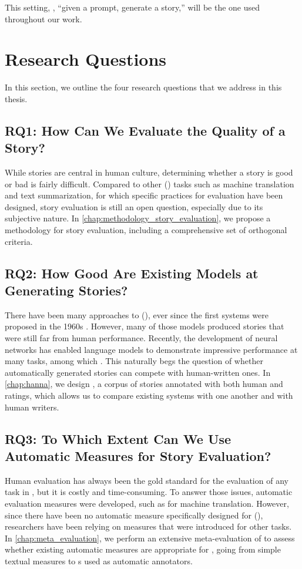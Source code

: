 This setting, {\ie}, ``given a prompt, generate a story,'' will be the one used throughout our work.

\section{Research Questions}

In this section, we outline the four research questions that we address in this thesis.

\subsection{RQ1: How Can We Evaluate the Quality of a Story?}
While stories are central in human culture, determining whether a story is good or bad is fairly difficult. Compared to other {\nlpfull} (\nlp) tasks such as machine translation and text summarization, for which specific practices for evaluation have been designed, story evaluation is still an open question, especially due to its subjective nature. In \autoref{chap:methodology_story_evaluation}, we propose a methodology for story evaluation, including a comprehensive set of orthogonal criteria.

\subsection{RQ2: How Good Are Existing Models at Generating Stories?}
There have been many approaches to {\asgfull} (\asg), ever since the first systems were proposed in the 1960s \citep{ryan2017grimes, propp1968morphology}. However, many of those models produced stories that were still far from human performance. Recently, the development of neural networks has enabled language models to demonstrate impressive performance at many {\nlp} tasks, among which \asg. This naturally begs the question of whether automatically generated stories can compete with human-written ones. In \autoref{chap:hanna}, we design {\hanna}, a corpus of stories annotated with both human and {\llm} ratings, which allows us to compare existing systems with one another and with human writers.

\subsection{RQ3: To Which Extent Can We Use Automatic Measures for Story Evaluation?}
Human evaluation has always been the gold standard for the evaluation of any task in {\nlp}, but it is costly and time-consuming. To answer those issues, automatic evaluation measures were developed, such as {\bleu} \citep{papineni2002bleu} for machine translation. However, since there have been no automatic measure specifically designed for {\asefull} (\ase), researchers have been relying on measures that were introduced for other tasks. In \autoref{chap:meta_evaluation}, we perform an extensive meta-evaluation of {\asg} to assess whether existing automatic measures are appropriate for {\ase}, going from simple textual measures to {\llmfull}s used as automatic annotators.

